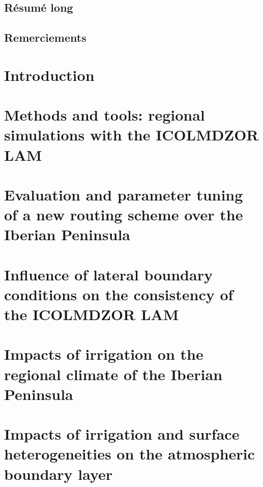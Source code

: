 \documentclass{report}
\begin{document}
\clearpage

\section*{Résumé long}
\section*{Remerciements}

\clearpage
\dominitoc
\renewcommand*\contentsname{Contents}
\tableofcontents
\newpage

\chapter{Introduction}
\label{chap:introduction}
\minitoc
\pagebreak


\chapter{Methods and tools: regional simulations with the ICOLMDZOR LAM}
\label{chap:methods}
\minitoc
\pagebreak


\chapter{Evaluation and parameter tuning of a new routing scheme over the Iberian Peninsula}
\label{chap:routing}
\minitoc
\pagebreak


\chapter{Influence of lateral boundary conditions on the consistency of the ICOLMDZOR LAM}
\label{chap:forcing}
\minitoc
\pagebreak


\chapter{Impacts of irrigation on the regional climate of the Iberian Peninsula}
\label{chap:monthly}
\minitoc
\pagebreak


\chapter{Impacts of irrigation and surface heterogeneities on the atmospheric boundary layer}
\label{chap:liaise}
\minitoc
\pagebreak

\end{document}
